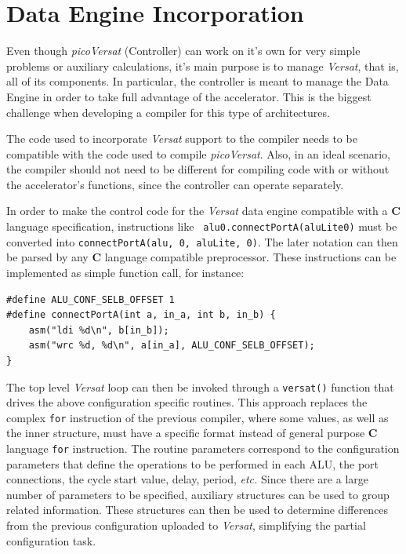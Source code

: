 \section{Data Engine Incorporation}

Even though {\it picoVersat} (Controller) can work on it's own for very simple
problems or auxiliary calculations, it's main purpose is to manage {\it Versat},
that is, all of its components.  In particular, the controller is meant to
manage the Data Engine in order to take full advantage of the accelerator.  This
is the biggest challenge when developing a compiler for this type of
architectures.

The code used to incorporate {\it Versat} support to the compiler needs to be
compatible with the code used to compile {\it picoVersat}.  Also, in an ideal
scenario, the compiler should not need to be different for compiling code with
or without the accelerator's functions, since the controller can operate
separately.

In order to make the control code for the {\it Versat} data engine compatible
with a {\bf C} language specification, instructions like {\tt
  alu0.connectPortA(aluLite0)} must be converted into {\tt connectPortA(alu, 0,
  aluLite, 0)}.  The later notation can then be parsed by any {\bf C} language
compatible preprocessor.
These instructions can be implemented as simple function call, for instance:
\begin{verbatim}
#define ALU_CONF_SELB_OFFSET 1
#define connectPortA(int a, in_a, int b, in_b) {
    asm("ldi %d\n", b[in_b]);
    asm("wrc %d, %d\n", a[in_a], ALU_CONF_SELB_OFFSET);
}
\end{verbatim}



The top level {\it Versat} loop can then be invoked through a {\tt versat()}
function that drives the above configuration specific routines.  This approach
replaces the complex {\tt for} instruction of the previous compiler, where some
values, as well as the inner structure, must have a specific format instead of
general purpose {\bf C} language {\tt for} instruction.  The routine parameters
correspond to the configuration parameters that define the operations to be
performed in each {\sc ALU}, the port connections, the cycle start value, delay,
period, {\em etc.}  Since there are a large number of parameters to be
specified, auxiliary structures can be used to group related information.  These
structures can then be used to determine differences from the previous
configuration uploaded to {\it Versat}, simplifying the partial configuration
task.

